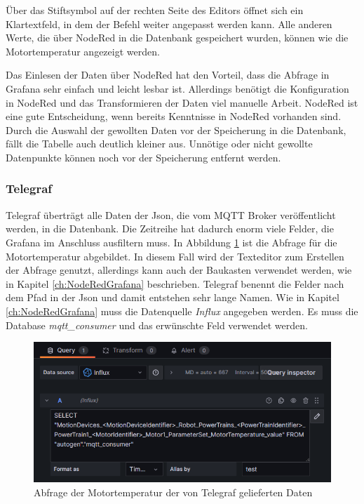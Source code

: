 \documentclass[a4paper, 12pt, oneside, toc=listofnumbered, bibliography=totoc]{scrbook}
\begin{document}
		Über das Stiftsymbol auf der rechten Seite des Editors öffnet sich ein Klartextfeld, in dem der Befehl weiter angepasst werden kann. Alle anderen Werte, die über NodeRed in die Datenbank gespeichert wurden, können wie die Motortemperatur angezeigt werden.
		
		Das Einlesen der Daten über NodeRed hat den Vorteil, dass die Abfrage in Grafana sehr einfach und leicht lesbar ist. Allerdings benötigt die Konfiguration in NodeRed und das Transformieren der Daten viel manuelle Arbeit. NodeRed ist eine gute Entscheidung, wenn bereits Kenntnisse in NodeRed vorhanden sind. Durch die Auswahl der gewollten Daten vor der Speicherung in die Datenbank, fällt die Tabelle auch deutlich kleiner aus. Unnötige oder nicht gewollte Datenpunkte können noch vor der Speicherung entfernt werden.
		
		\subsubsection{Telegraf}
		
		Telegraf überträgt alle Daten der Json, die vom MQTT Broker veröffentlicht werden, in die Datenbank. Die Zeitreihe hat dadurch enorm viele Felder, die Grafana im Anschluss ausfiltern muss. In Abbildung \ref{fig:telegrafabfrage} ist die Abfrage für die Motortemperatur abgebildet. In diesem Fall wird der Texteditor zum Erstellen der Abfrage genutzt, allerdings kann auch der Baukasten verwendet werden, wie in Kapitel \ref{ch:NodeRedGrafana} beschrieben. Telegraf benennt die Felder nach dem Pfad in der Json und damit entstehen sehr lange Namen. Wie in Kapitel \ref{ch:NodeRedGrafana} muss die Datenquelle \textit{Influx} angegeben werden. Es muss die Database \textit{mqtt\_consumer} und das erwünschte Feld verwendet werden.
		
		\begin{figure}[H]
			\centering
			\includegraphics[width=0.9\linewidth]{res/TelegrafAbfrage.png}
			\caption{Abfrage der Motortemperatur der von Telegraf gelieferten Daten}
			\label{fig:telegrafabfrage}
		\end{figure}
		
\end{document}
